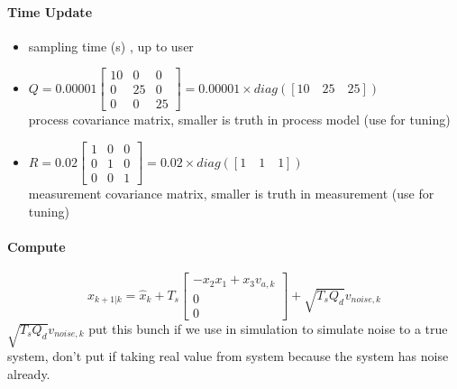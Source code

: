 	\paragraph{Time Update}
	\begin{itemize}
		\item { sampling time (s) , up to user}
		\item \(Q = 0.00001
		\begin{bmatrix}
			10 & 0  & 0  \\
			0  & 25 & 0  \\
			0  & 0  & 25 
		\end{bmatrix} 
		= 0.00001 \times diag([10\quad 25\quad 25])\) \\process covariance matrix, smaller is truth in process model (use for tuning)
		\item \(R = 0.02
		\begin{bmatrix}
			1 & 0 & 0 \\
			0 & 1 & 0 \\
			0 & 0 & 1 
		\end{bmatrix} 
		= 0.02 \times diag([1\quad 1\quad 1])\) \\measurement covariance matrix, smaller is truth in measurement (use for tuning)
	\end{itemize}

	\paragraph{Compute} \[\hat{x}_{k+1|k} = \hat{x}_k + T_s
	\begin{bmatrix}
		-x_2 x_1 + x_3 v_{a,k} \\
		0                      \\
		0                      
	\end{bmatrix} + \boxed{\sqrt{T_s Q_d}v_{noise,k}}\]
	$\sqrt{T_s Q_d}v_{noise,k}$ put this bunch if we use in simulation to simulate noise to a true system, don't put if taking real value from system because the system has noise already.
	
